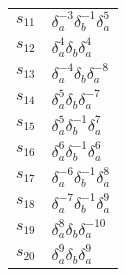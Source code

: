 \documentclass{article}
\begin{document}
\begin{center}
\begin{tabular}{ll}
$s_{11}$ & $\delta_a^{-3}\delta_b^{-1}\delta_a^{5}$ \\
$s_{12}$ & $\delta_a^{4}\delta_b^{}\delta_a^{4}$ \\
$s_{13}$ & $\delta_a^{-4}\delta_b^{}\delta_a^{-8}$ \\
$s_{14}$ & $\delta_a^{5}\delta_b^{}\delta_a^{-7}$ \\
$s_{15}$ & $\delta_a^{5}\delta_b^{-1}\delta_a^{7}$ \\
$s_{16}$ & $\delta_a^{6}\delta_b^{-1}\delta_a^{6}$ \\
$s_{17}$ & $\delta_a^{-6}\delta_b^{-1}\delta_a^{8}$ \\
$s_{18}$ & $\delta_a^{-7}\delta_b^{-1}\delta_a^{9}$ \\
$s_{19}$ & $\delta_a^{8}\delta_b^{}\delta_a^{-10}$ \\
$s_{20}$ & $\delta_a^{9}\delta_b^{}\delta_a^{9}$ \\
\bottomrule
\end{tabular}
\end{center}

\thispagestyle{empty}
\end{document}
